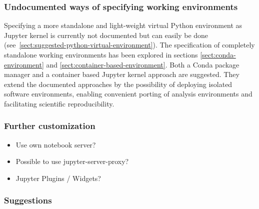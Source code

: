 \subsubsection{Undocumented ways of specifying working environments}

Specifying a more standalone and light-weight virtual Python environment as Jupyter kernel is currently not documented but can easily be done (see~\ref{sect:suggested-python-virtual-environment}).
The specification of completely standalone working environments has been explored in sections \ref{sect:conda-environment} and \ref{sect:container-based-environment}.
Both a Conda package manager and a container based Jupyter kernel approach are suggested.
They extend the documented approaches by the possibility of deploying isolated software environments, enabling convenient porting of analysis environments and facilitating scientific reproducibility.

\subsubsection{Further customization}

\begin{itemize}
  \item Use own notebook server?
  \item Possible to use jupyter-server-proxy?
  \item Jupyter Plugins / Widgets?
\end{itemize}

\subsubsection{Suggestions}

